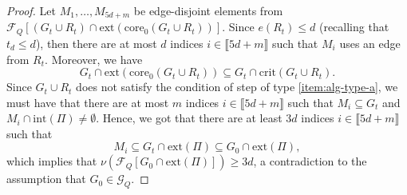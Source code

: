 \documentclass[11pt,a4paper,oneside,reqno]{amsart}
\newcommand{\Gnp}{G_{n, p}^{(3)}}
\newcommand{\cC}{\mathcal{C}}
\newcommand{\cE}{\mathcal{E}}
\newcommand{\cF}{\mathcal{F}}
\newcommand{\cG}{\mathcal{G}}
\renewcommand{\Pr}{\mathbb{P}}
\newcommand{\1}{\mathbbm{1}} %
\newcommand{\br}[1]{\llbracket{#1}\rrbracket}
\renewcommand{\le}{\leqslant}
\renewcommand{\ge}{\geqslant}
\newcommand{\ext}{\mathrm{ext}}
\renewcommand{\int}{\mathrm{int}}
\newcommand{\crit}{\mathrm{crit}}
\newcommand{\core}{\mathrm{core}}
\begin{document}
\begin{proof}
    Let $M_1, \dots, M_{5d + m}$ be edge-disjoint elements from $\cF_Q\left[(G_t \cup R_t) \cap \ext\left(\core_0(G_t \cup R_t)\right)\right]$. Since $e(R_t) \le d$ (recalling that $t_d \le d$), then there are at most $d$ indices $i \in \br{5d + m}$ such that $M_i$ uses an edge from $R_t$. Moreover, we have
    \[
        G_t \cap \ext\left(\core_0(G_t \cup R_t)\right) \subseteq G_t \cap \crit(G_t \cup R_t).
    \]
    Since $G_t \cup R_t$ does not satisfy the condition of step of type \ref{item:alg-type-a}, we must have that there are at most $m$ indices $i \in \br{5d + m}$ such that $M_i \subseteq G_t$ and $M_i \cap \int(\Pi) \neq \emptyset$. Hence, we got that there are at least $3d$ indices $i \in \br{5d + m}$ such that 
    \[
        M_i \subseteq G_t \cap \ext\left(\Pi\right) \subseteq G_0 \cap \ext\left(\Pi\right),
    \]
    which implies that $\nu\left(\cF_Q\left[G_0 \cap \ext\left(\Pi\right)\right]\right) \ge 3d$, a contradiction to the assumption that $G_0 \in \cG_Q$.



    



\end{proof}
\end{document}
